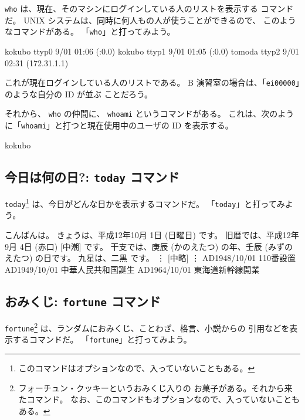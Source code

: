  \texttt{who} は、現在、そのマシンにログインしている人のリストを表示する
コマンドだ。
 UNIX システムは、同時に何人もの人が使うことができるので、
このようなコマンドがある。
「\texttt{who}」と打ってみよう。

\begin{progls}
kokubo   ttyp0     9/01 01:06   (:0.0)
kokubo   ttyp1     9/01 01:05   (:0.0)
tomoda   ttyp2     9/01 02:31   (172.31.1.1)
% 
\end{progls}

これが現在ログインしている人のリストである。
 B 演習室の場合は、「\texttt{ei00000}」のような自分の ID が並ぶ
ことだろう。

\bigskip

それから、 \texttt{who} の仲間に、 \texttt{whoami} というコマンドがある。
これは、次のように「\texttt{whoami}」と打つと現在使用中のユーザの ID
を表示する。

\begin{progls}
kokubo
%
\end{progls}


\subsection{今日は何の日?: \texttt{today} コマンド}

 \texttt{today}\footnote{このコマンドはオプションなので、入っていないこともある。}
 は、今日がどんな日かを表示するコマンドだ。
「\texttt{today}」と打ってみよう。

\begin{progls}
こんばんは。
きょうは、平成12年10月 1日 (日曜日) です。
旧暦では、平成12年 9月 4日 (赤口) [中潮] です。
干支では、庚辰 (かのえたつ) の年、壬辰 (みずのえたつ) の日です。
九星は、二黒 です。
            \textrm{\vdots}
         [中略]
            \textrm{\vdots}
AD1948/10/01  110番設置
AD1949/10/01  中華人民共和国誕生
AD1964/10/01  東海道新幹線開業
%
\end{progls}

\subsection{おみくじ: \texttt{fortune} コマンド}

 \texttt{fortune}\footnote{フォーチュン・クッキーというおみくじ入りの
お菓子がある。それから来たコマンド。
なお、このコマンドもオプションなので、入っていないこともある。}
は、ランダムにおみくじ、ことわざ、格言、小説からの
引用などを表示するコマンドだ。
「\texttt{fortune}」と打ってみよう。

